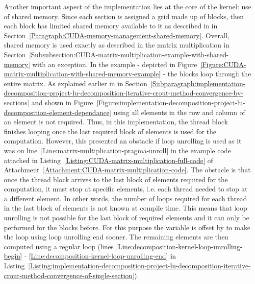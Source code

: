 Another important aspect of the implementation lies at the core of the kernel: use of shared memory. Since each section is assigned a grid made up of blocks, then each block has limited shared memory available to it as described in \textit{} in Section~\ref{Paragraph:CUDA-memory-management-shared-memory}. Overall, shared memory is used exactly as described in the matrix multiplication \textit{} in Section~\ref{Subsubsection:CUDA-matrix-multiplication-example-with-shared-memory} with an exception. In the example - depicted in Figure~\ref{Figure:CUDA-matrix-multiplication-with-shared-memory-example} - the blocks loop through the entire matrix. As explained earlier in \textit{} in Section~\ref{Subparagraph:implementation-decomposition-project-lu-decomposition-iterative-crout-method-convergence-by-sections} and shown in Figure~\ref{Figure:implementation-decomposition-project-lu-decomposition-element-dependance} using all elements in the row and column of an element is not required. Thus, in this implementation, the thread block finishes looping once the last required block of elements is used for the computation. However, this presented an obstacle if loop unrolling is used as it was on line~\ref{Line:matrix-multiplication-pragma-unroll} in the example code attached in Listing~\ref{Listing:CUDA-matrix-multiplication-full-code} of Attachment~\ref{Attachment:CUDA-matrix-multiplication-code}. The obstacle is that once the thread block arrives to the last block of elements required for the computation, it must stop at specific elements, i.e. each thread needed to stop at a different element. In other words, the number of loops required for each thread in the last block of elements is not known at compile time. This means that loop unrolling is not possible for the last block of required elements and it can only be performed for the blocks before. For this purpose the variable  is offset by  to make the loop using loop unrolling end sooner. The remaining elements are then computed using a regular  loop (lines \ref{Line:decomposition-kernel-loop-unrolling-begin} - \ref{Line:decomposition-kernel-loop-unrolling-end} in Listing~\ref{Listing:implementation-decomposition-project-lu-decomposition-iterative-crout-method-convergence-of-single-section}). \\
